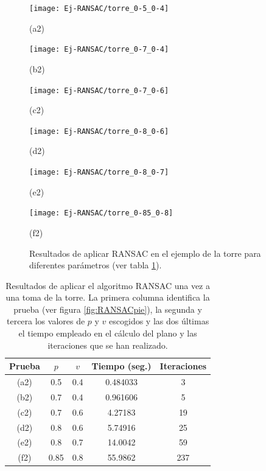 \begin{figure}[h!]
	\begin{minipage}[b]{0.5\textwidth}
		\centering
		\texttt{[image: Ej-RANSAC/torre\_0-5\_0-4]} 
		\caption*{(a2)}
	\end{minipage}
	\begin{minipage}[b]{0.5\textwidth}
		\centering
		\texttt{[image: Ej-RANSAC/torre\_0-7\_0-4]} 
		\caption*{(b2)}
	\end{minipage}
	\begin{minipage}[b]{0.5\textwidth}
		\centering
		\texttt{[image: Ej-RANSAC/torre\_0-7\_0-6]} 
		\caption*{(c2)}
	\end{minipage}
	\begin{minipage}[b]{0.5\textwidth}
		\centering
		\texttt{[image: Ej-RANSAC/torre\_0-8\_0-6]} 
		\caption*{(d2)}
	\end{minipage}		
	\begin{minipage}[b]{0.5\textwidth}
		\centering
		\texttt{[image: Ej-RANSAC/torre\_0-8\_0-7]} 
		\caption*{(e2)}
	\end{minipage}
	\begin{minipage}[b]{0.5\textwidth}
		\centering
		\texttt{[image: Ej-RANSAC/torre\_0-85\_0-8]} 
		\caption*{(f2)}
	\end{minipage}	
	
	\caption{Resultados de aplicar RANSAC en el ejemplo de la torre para diferentes parámetros (ver tabla \ref{table:RANSACtorreTable}). }
	\label{fig:RANSACtorre}
\end{figure}

\begin{table}[h!]
	\centering
	\begin{tabular}{| c | c | c || c | c |} 
		\hline
		Prueba & $ p $ & $ v $ & Tiempo (seg.) & Iteraciones \\
		\hline
		(a2) & 0.5 & 0.4 & 0.484033 & 3 \\		
		(b2) & 0.7 & 0.4 & 0.961606 & 5  \\	
		(c2) & 0.7 & 0.6 & 4.27183 &  19 \\
		(d2) & 0.8 & 0.6 & 5.74916 & 25\\
		(e2) & 0.8 & 0.7 & 14.0042 & 59 \\
		(f2) & 0.85 & 0.8 & 55.9862 & 237\\
		\hline
	\end{tabular}
	\caption{Resultados de aplicar el algoritmo RANSAC una vez a una toma de  la torre. La primera columna identifica la prueba (ver figura \ref{fig:RANSACpie}), la segunda y tercera los valores de $ p $ y $ v $ escogidos y las dos últimas el tiempo empleado en el cálculo del plano y las iteraciones que se han realizado.}
	\label{table:RANSACtorreTable}
\end{table}

